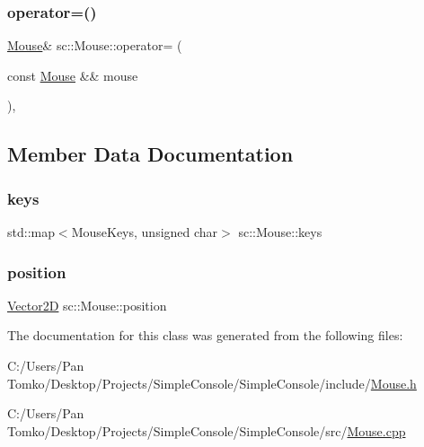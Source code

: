 \mbox{\label{classsc_1_1_mouse_aa84efee53d6b684486d2edc79f8ea898}} 
\subsubsection{\texorpdfstring{operator=()}{operator=()}\hspace{0.1cm}{\footnotesize\ttfamily [2/2]}}
{\footnotesize\ttfamily \mbox{\hyperlink{classsc_1_1_mouse}{Mouse}}\& sc\+::\+Mouse\+::operator= (\begin{DoxyParamCaption}\item[{const \mbox{\hyperlink{classsc_1_1_mouse}{Mouse}} \&\&}]{mouse }\end{DoxyParamCaption})\hspace{0.3cm}{\ttfamily [private]}, {\ttfamily [delete]}}



\subsection{Member Data Documentation}
\mbox{\label{classsc_1_1_mouse_a9389587000931c81c45eef82921f8491}} 
\subsubsection{\texorpdfstring{keys}{keys}}
{\footnotesize\ttfamily std\+::map$<$Mouse\+Keys, unsigned char$>$ sc\+::\+Mouse\+::keys}

\mbox{\label{classsc_1_1_mouse_a6148d8e9f122e83d0024ab77523a1e49}} 
\subsubsection{\texorpdfstring{position}{position}}
{\footnotesize\ttfamily \mbox{\hyperlink{classsc_1_1_vector2_d}{Vector2D}} sc\+::\+Mouse\+::position}



The documentation for this class was generated from the following files\+:\begin{DoxyCompactItemize}
\item 
C\+:/\+Users/\+Pan Tomko/\+Desktop/\+Projects/\+Simple\+Console/\+Simple\+Console/include/\mbox{\hyperlink{_mouse_8h}{Mouse.\+h}}\item 
C\+:/\+Users/\+Pan Tomko/\+Desktop/\+Projects/\+Simple\+Console/\+Simple\+Console/src/\mbox{\hyperlink{_mouse_8cpp}{Mouse.\+cpp}}\end{DoxyCompactItemize}
